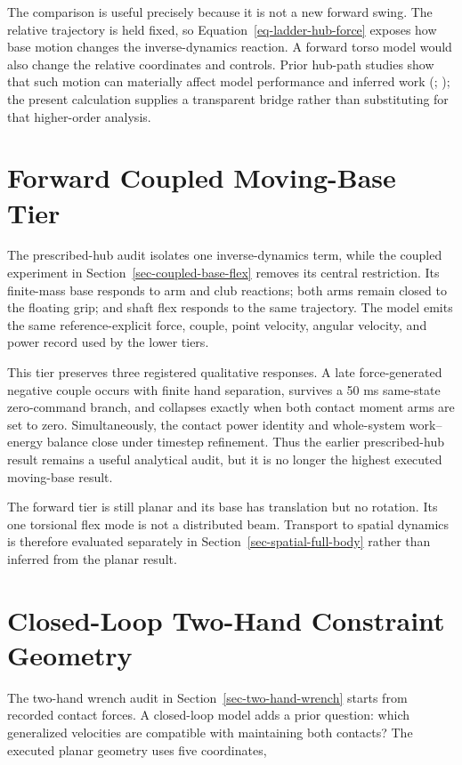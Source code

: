 \documentclass[
  letterpaper,
]{report}
\begin{document}
The comparison is useful precisely because it is not a new forward
swing. The relative trajectory is held fixed, so
Equation~\ref{eq-ladder-hub-force} exposes how base motion changes the
inverse-dynamics reaction. A forward torso model would also change the
relative coordinates and controls. Prior hub-path studies show that such
motion can materially affect model performance and inferred work
(;
); the present
calculation supplies a transparent bridge rather than substituting for
that higher-order analysis.

\section{Forward Coupled Moving-Base
Tier}\label{sec-ladder-forward-coupled}

The prescribed-hub audit isolates one inverse-dynamics term, while the
coupled experiment in Section~\ref{sec-coupled-base-flex} removes its
central restriction. Its finite-mass base responds to arm and club
reactions; both arms remain closed to the floating grip; and shaft flex
responds to the same trajectory. The model emits the same
reference-explicit force, couple, point velocity, angular velocity, and
power record used by the lower tiers.

This tier preserves three registered qualitative responses. A late
force-generated negative couple occurs with finite hand separation,
survives a 50 ms same-state zero-command branch, and collapses exactly
when both contact moment arms are set to zero. Simultaneously, the
contact power identity and whole-system work--energy balance close under
timestep refinement. Thus the earlier prescribed-hub result remains a
useful analytical audit, but it is no longer the highest executed
moving-base result.

The forward tier is still planar and its base has translation but no
rotation. Its one torsional flex mode is not a distributed beam.
Transport to spatial dynamics is therefore evaluated separately in
Section~\ref{sec-spatial-full-body} rather than inferred from the planar
result.

\section{Closed-Loop Two-Hand Constraint
Geometry}\label{sec-ladder-closed-loop}

The two-hand wrench audit in Section~\ref{sec-two-hand-wrench} starts
from recorded contact forces. A closed-loop model adds a prior question:
which generalized velocities are compatible with maintaining both
contacts? The executed planar geometry uses five coordinates,
\end{document}
